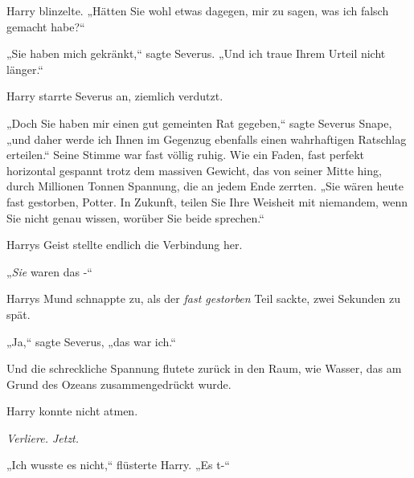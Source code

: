 Harry blinzelte. „Hätten Sie wohl etwas dagegen, mir zu sagen, was ich falsch gemacht habe?“

„Sie haben mich gekränkt,“ sagte Severus. „Und ich traue Ihrem Urteil nicht länger.“

Harry starrte Severus an, ziemlich verdutzt.

„Doch Sie haben mir einen gut gemeinten Rat gegeben,“ sagte Severus Snape, „und daher werde ich Ihnen im Gegenzug ebenfalls einen wahrhaftigen Ratschlag erteilen.“ Seine Stimme war fast völlig ruhig. Wie ein Faden, fast perfekt horizontal gespannt trotz dem massiven Gewicht, das von seiner Mitte hing, durch Millionen Tonnen Spannung, die an jedem Ende zerrten. „Sie wären heute fast gestorben, Potter. In Zukunft, teilen Sie Ihre Weisheit mit niemandem, wenn Sie nicht genau wissen, worüber Sie beide sprechen.“

Harrys Geist stellte endlich die Verbindung her.

„\emph{Sie} waren das -“

Harrys Mund schnappte zu, als der \emph{fast gestorben} Teil sackte, zwei Sekunden zu spät.

„Ja,“ sagte Severus, „das war ich.“

Und die schreckliche Spannung flutete zurück in den Raum, wie Wasser, das am Grund des Ozeans zusammengedrückt wurde.

Harry konnte nicht atmen.

\emph{Verliere. Jetzt.}

„Ich wusste es nicht,“ flüsterte Harry. „Es t-“

